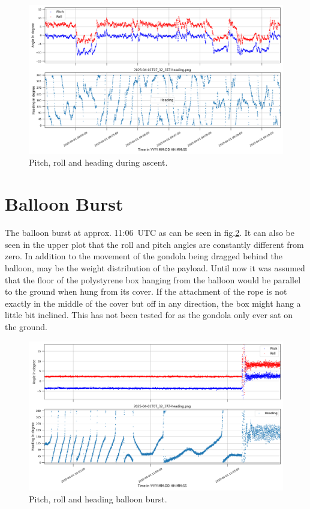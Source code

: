 \begin{figure}[H]
    \centering
    \includegraphics[width=\linewidth]{images/04_results/mid_flight_heading.png}
    \caption[Heading during ascent.]{Pitch, roll and heading during ascent.}
    \label{fig:res:ascent_heading}
\end{figure}


\section{Balloon Burst \label{sec:balloon_burst}}
The balloon burst at approx. 11:06~UTC as can be seen in fig.\ref{fig:res:burst_heading}. It can also be seen in the upper plot that the roll and pitch angles are constantly different from zero. In addition to the movement of the gondola being dragged behind the balloon, may be the weight distribution of the payload. Until now it was assumed that the floor of the polystyrene box hanging from the balloon would be parallel to the ground when hung from its cover. If the attachment of the rope is not exactly in the middle of the cover but off in any direction, the box might hang a little bit inclined. This has not been tested for as the gondola only ever sat on the ground. 

\begin{figure}[H]
    \centering
    \includegraphics[width=\linewidth]{images/04_results/pop_heading.png}
    \caption[Heading at balloon burst.]{Pitch, roll and heading balloon burst.}
    \label{fig:res:burst_heading}
\end{figure}


